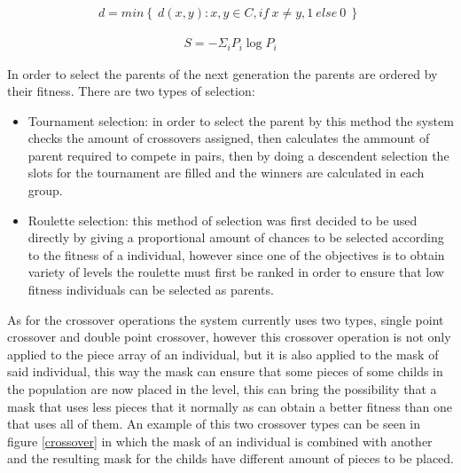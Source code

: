 \documentclass[conference]{IEEEtran}
\begin{document}
    \begin{equation}
        \begin{aligned}
        d = min \left\{ \ d(x,y): x,y \in C, if \: x \neq y, 1 \: else \: 0 \: \right\} \
        \end{aligned}
        \label{hamming_distance}
    \end{equation}
    
    \begin{equation}
        \begin{aligned}
        S = - \Sigma_i P_i \log P_i
        \end{aligned}
        \label{shannon_entropy}
    \end{equation}

    In order to select the parents of the next generation the parents are ordered by
    their fitness. There are two types of selection:
    
    \begin{itemize}
        \item Tournament selection: in order to select the parent by this method the
        system checks the amount of crossovers assigned, then calculates the ammount
        of parent required to compete in pairs, then by doing a descendent selection
        the slots for the tournament are filled and the winners are calculated in
        each group.
        \item Roulette selection: this method of selection was first decided to be
        used directly by giving a proportional amount of chances to be selected
        according to the fitness of a individual, however since one of the
        objectives is to obtain variety of levels the roulette must first be ranked
        in order to ensure that low fitness individuals can be selected as parents.
    \end{itemize}
    
    As for the crossover operations the system currently uses two types, single
    point crossover and double point crossover, however this crossover operation is
    not only applied to the piece array of an individual, but it is also applied to
    the mask of said individual, this way the mask can ensure that some pieces of
    some childs in the population are now placed in the level, this can bring the
    possibility that a mask that uses less pieces that it normally as can obtain a
    better fitness than one that uses all of them. An example of this two crossover
    types can be seen in figure \ref{crossover} in which the mask of an individual
    is combined with another and the resulting mask for the childs have different
    amount of pieces to be placed.
    
\end{document}
